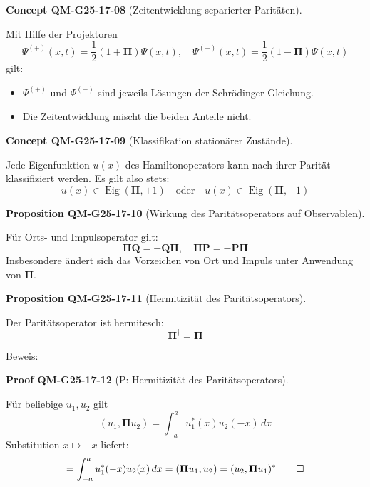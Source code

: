 \documentclass[10pt, letterpaper]{article}
\newcommand{\CustomHeading}[3]{%
  \par\medskip\noindent%
  \textbf{#1 #2} \textnormal{(#3)}.\enskip%
}
\newenvironment{PROP}[2]{\begin{unitbox}\CustomHeading{Proposition}{#1}{#2}}{\end{unitbox}}
\newenvironment{CONC}[2]{\begin{unitbox}\CustomHeading{Concept}{#1}{#2}}{\end{unitbox}}
\newenvironment{PROOF}[2]{\begin{unitbox}\CustomHeading{Proof}{#1}{#2}}{\end{unitbox}}
\begin{document}
\begin{CONC}{QM-G25-17-08}{Zeitentwicklung separierter Paritäten}
Mit Hilfe der Projektoren
\[
\Psi^{(+)}(x, t) = \frac{1}{2}(1 + \boldsymbol{\Pi}) \Psi(x,t), \quad \Psi^{(-)}(x, t) = \frac{1}{2}(1 - \boldsymbol{\Pi}) \Psi(x,t)
\]
gilt:
\begin{itemize}
\item $\Psi^{(+)}$ und $\Psi^{(-)}$ sind jeweils Lösungen der Schrödinger-Gleichung.
\item Die Zeitentwicklung mischt die beiden Anteile nicht.
\end{itemize}
\end{CONC}


\begin{CONC}{QM-G25-17-09}{Klassifikation stationärer Zustände}
Jede Eigenfunktion $u(x)$ des Hamiltonoperators kann nach ihrer Parität klassifiziert werden. Es gilt also stets:
\[
u(x) \in \operatorname{Eig}(\boldsymbol{\Pi}, +1) \quad \text{oder} \quad u(x) \in \operatorname{Eig}(\boldsymbol{\Pi}, -1)
\]
\end{CONC}



\begin{PROP}{QM-G25-17-10}{Wirkung des Paritätsoperators auf Observablen}
Für Orts- und Impulsoperator gilt:
\[
\boldsymbol{\Pi} \mathbf{Q} = -\mathbf{Q} \boldsymbol{\Pi}, \quad \boldsymbol{\Pi} \mathbf{P} = -\mathbf{P} \boldsymbol{\Pi}
\]
Insbesondere ändert sich das Vorzeichen von Ort und Impuls unter Anwendung von $\boldsymbol{\Pi}$.
\end{PROP}



\begin{PROP}{QM-G25-17-11}{Hermitizität des Paritätsoperators}
Der Paritätsoperator ist hermitesch:
\[
\boldsymbol{\Pi}^\dagger = \boldsymbol{\Pi}
\]
\end{PROP}


Beweis: 

\begin{PROOF}{QM-G25-17-12}{P: Hermitizität des Paritätsoperators}
Für beliebige $u_1, u_2$ gilt
\[
(u_1, \boldsymbol{\Pi} u_2) = \int_{-a}^{a} u_1^*(x) u_2(-x)\, dx
\]
Substitution $x \mapsto -x$ liefert:
\[
= \int_{-a}^{a} u_1^*(-x) u_2(x)\, dx = (\boldsymbol{\Pi} u_1, u_2) = (u_2, \boldsymbol{\Pi} u_1)^*
\qed
\]
\end{PROOF}






\pagebreak
\end{document}
